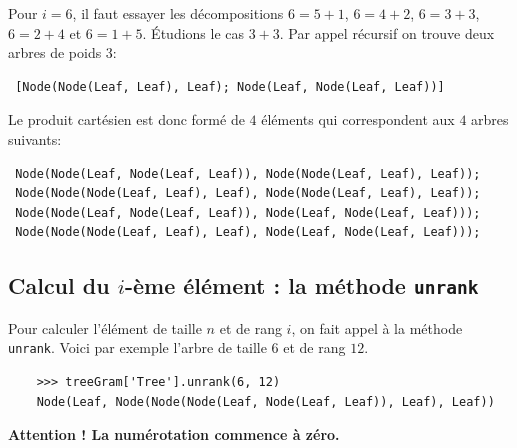 \documentclass[11pt]{article}
\begin{document}
Pour $i=6$, il faut essayer les décompositions $6=5+1$, $6=4+2$, $6=3+3$,
$6=2+4$ et $6=1+5$. Étudions le cas $3+3$. Par appel récursif on trouve deux
arbres de poids $3$:
\begin{verbatim}
 [Node(Node(Leaf, Leaf), Leaf); Node(Leaf, Node(Leaf, Leaf))]
\end{verbatim}
Le produit cartésien est donc formé de $4$ éléments qui correspondent aux $4$
arbres suivants:
\begin{verbatim}
 Node(Node(Leaf, Node(Leaf, Leaf)), Node(Node(Leaf, Leaf), Leaf));
 Node(Node(Node(Leaf, Leaf), Leaf), Node(Node(Leaf, Leaf), Leaf));
 Node(Node(Leaf, Node(Leaf, Leaf)), Node(Leaf, Node(Leaf, Leaf)));
 Node(Node(Node(Leaf, Leaf), Leaf), Node(Leaf, Node(Leaf, Leaf)));
\end{verbatim}


\subsection{Calcul du $i$-ème élément : la méthode \texttt{unrank}}

Pour calculer l'élément de taille $n$ et de rang $i$, on fait appel à la
méthode \texttt{unrank}. Voici par exemple l'arbre de taille $6$ et de rang
$12$.
\begin{verbatim}
    >>> treeGram['Tree'].unrank(6, 12)
    Node(Leaf, Node(Node(Node(Leaf, Node(Leaf, Leaf)), Leaf), Leaf))
\end{verbatim}
\textbf{Attention ! La numérotation commence à zéro.}
\end{document}
